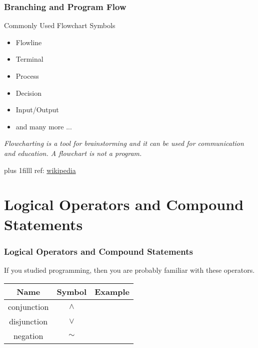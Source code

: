 \documentclass[fleqn]{beamer} %
\newcommand{\sectiontitleIV}{Branching and Program Flow}
\newcommand{\sectiontitleV}{Logical Operators and Compound Statements}
\newcommand{\btVFill}{\vskip0pt plus 1filll}
\begin{document}
	\begin{frame}[label=sectionIV,containsverbatim] \small
	\frametitle{\sectiontitleIV}    
	
	Commonly Used Flowchart Symbols
	
	\begin{itemize}
		\item Flowline
		\item Terminal
		\item Process
		\item Decision
		\item Input/Output
		\item and many more ... 
		
	\end{itemize}

	{\it Flowcharting is a tool for brainstorming and it can be used for communication and education. A flowchart is not a program. }
	
	
	\btVFill
	\tiny{ref: \href{https://en.wikipedia.org/wiki/Flowchart}{wikipedia}} 
\end{frame}

\section{\sectiontitleV}	
	\begin{frame}[label=sectionV,containsverbatim] \small
	\frametitle{\sectiontitleV}    
	
	If you studied programming, then you are probably familiar with these operators.  \vspace{5mm}\\
	
	\renewcommand*{\arraystretch}{1.5}
	\begin{tabular}{c|c|c} 
		Name&Symbol&Example\\ \hline
		conjunction&$\wedge$ & \\ \hline
		disjunction&$\vee$ & \\ \hline
		negation&$\sim$& \\ \hline

	\end{tabular}

	\end{frame}
	
\end{document}
